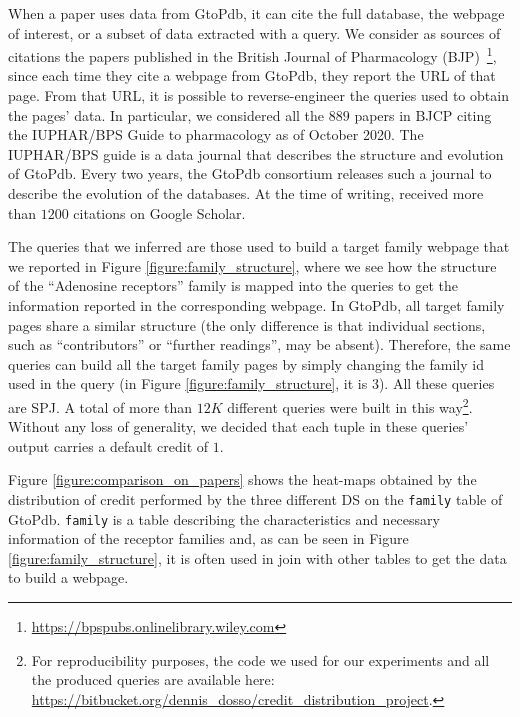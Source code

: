 When a paper uses data from GtoPdb, it can cite the full database, the webpage of interest, or a subset of data extracted with a query. 
We consider as sources of citations the papers published in the British Journal of Pharmacology (BJP)~\footnote{\url{https://bpspubs.onlinelibrary.wiley.com}}, since each time they cite a webpage from GtoPdb, they report the URL of that page. From that URL, it is possible to reverse-engineer the queries used to obtain the pages' data. 
In particular, we considered all the $889$ papers in BJCP citing the IUPHAR/BPS Guide to pharmacology \citep{iuphar2018} as of October 2020. The IUPHAR/BPS guide is a data journal that describes the structure and evolution of GtoPdb. Every two years, the GtoPdb consortium releases such a journal to describe the evolution of the databases.
At the time of writing, \citep{iuphar2018} received more than $1200$ citations on Google Scholar. 

The queries that we inferred are those used to build a target family webpage that we reported in Figure \ref{figure:family_structure}, where we see how the structure of the ``Adenosine receptors'' family is mapped into the queries to get the information reported in the corresponding webpage. 
In GtoPdb, all target family pages share a similar structure (the only difference is that individual sections, such as ``contributors'' or ``further readings'', may be absent).
Therefore, the same queries can build all the target family pages by simply changing the family id used in the query (in Figure \ref{figure:family_structure}, it is 3). All these queries are SPJ. 
A total of more than $12K$ different queries were built in this way\footnote{For reproducibility purposes, the code we used for our experiments and all the produced queries are available here: \url{https://bitbucket.org/dennis_dosso/credit_distribution_project}.}.
Without any loss of generality, we decided that each tuple in these queries' output carries a default credit of $1$.

Figure \ref{figure:comparison_on_papers} shows the heat-maps obtained by the distribution of credit performed by the three different DS on the  \texttt{family} table of GtoPdb.
\texttt{family} is a table describing the characteristics and necessary information of the receptor families and, as can be seen in Figure \ref{figure:family_structure}, it is often used in join with other tables to get the data to build a webpage.

